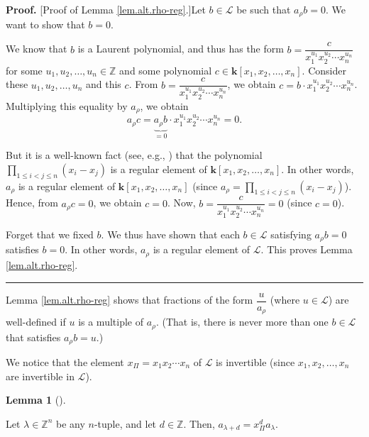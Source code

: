 \documentclass[numbers=enddot,12pt,final,onecolumn,notitlepage]{scrartcl}%
\theoremstyle{definition}
\newtheorem{lem}[theo]{Lemma}
\newenvironment{lemma}[1][]
{\begin{lem}[#1]\begin{leftbar}}
{\end{leftbar}\end{lem}}
\newenvironment{proof}[1][Proof]{\noindent\textbf{#1.} }{\ \rule{0.5em}{0.5em}}
\let\prodnonlimits\prod
\renewcommand{\prod}{\prodnonlimits\limits}
\begin{document}
\begin{proof}
[Proof of Lemma \ref{lem.alt.rho-reg}.]Let $b\in\mathcal{L}$ be such that
$a_{\rho}b=0$. We want to show that $b=0$.

We know that $b$ is a Laurent polynomial, and thus has the form $b=\dfrac
{c}{x_{1}^{u_{1}}x_{2}^{u_{2}}\cdots x_{n}^{u_{n}}}$ for some $u_{1}%
,u_{2},\ldots,u_{n}\in\mathbb{Z}$ and some polynomial $c\in\mathbf{k}\left[
x_{1},x_{2},\ldots,x_{n}\right]  $. Consider these $u_{1},u_{2},\ldots,u_{n}$
and this $c$. From $b=\dfrac{c}{x_{1}^{u_{1}}x_{2}^{u_{2}}\cdots x_{n}^{u_{n}%
}}$, we obtain $c=b\cdot x_{1}^{u_{1}}x_{2}^{u_{2}}\cdots x_{n}^{u_{n}}$.
Multiplying this equality by $a_{\rho}$, we obtain%
\[
a_{\rho}c=\underbrace{a_{\rho}b}_{=0}\cdot x_{1}^{u_{1}}x_{2}^{u_{2}}\cdots
x_{n}^{u_{n}}=0.
\]


But it is a well-known fact (see, e.g., \cite[Corollary 4.4]{Grinbe19}) that
the polynomial $\prod_{1\leq i<j\leq n}\left(  x_{i}-x_{j}\right)  $ is a
regular element of $\mathbf{k}\left[  x_{1},x_{2},\ldots,x_{n}\right]  $. In
other words, $a_{\rho}$ is a regular element of $\mathbf{k}\left[  x_{1}%
,x_{2},\ldots,x_{n}\right]  $ (since $a_{\rho}=\prod_{1\leq i<j\leq n}\left(
x_{i}-x_{j}\right)  $). Hence, from $a_{\rho}c=0$, we obtain $c=0$. Now,
$b=\dfrac{c}{x_{1}^{u_{1}}x_{2}^{u_{2}}\cdots x_{n}^{u_{n}}}=0$ (since $c=0$).

Forget that we fixed $b$. We thus have shown that each $b\in\mathcal{L}$
satisfying $a_{\rho}b=0$ satisfies $b=0$. In other words, $a_{\rho}$ is a
regular element of $\mathcal{L}$. This proves Lemma \ref{lem.alt.rho-reg}.
\end{proof}

Lemma \ref{lem.alt.rho-reg} shows that fractions of the form $\dfrac
{u}{a_{\rho}}$ (where $u\in\mathcal{L}$) are well-defined if $u$ is a multiple
of $a_{\rho}$. (That is, there is never more than one $b\in\mathcal{L}$ that
satisfies $a_{\rho}b=u$.)

We notice that the element $x_{\Pi}=x_{1}x_{2}\cdots x_{n}$ of $\mathcal{L}$
is invertible (since $x_{1},x_{2},\ldots,x_{n}$ are invertible in
$\mathcal{L}$).

\begin{lemma}
\label{lem.alt.move}Let $\lambda\in\mathbb{Z}^{n}$ be any $n$-tuple, and let
$d\in\mathbb{Z}$. Then, $a_{\lambda+d}=x_{\Pi}^{d}a_{\lambda}$.
\end{lemma}
\end{document}
